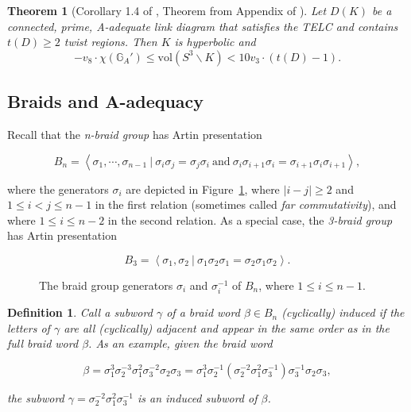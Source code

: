 \documentclass{article}
\newtheorem{definition}{Definition}[section]
\newtheorem{theorem}{Theorem}[section]
\begin{document}
\begin{theorem}[Corollary 1.4 of \cite{New}, Theorem from Appendix of \cite{Lackenby}]
Let $D(K)$ be a connected, prime, A-adequate link diagram that satisfies the TELC and contains $t(D) \geq 2$ twist regions. Then $K$ is hyperbolic and
\label{Cor}
\begin{equation*}
-v_{8}\cdot\chi(\mathbb{G}_{A}') \leq \mathrm{vol}(S^{3}\backslash K) < 10v_{3}\cdot(t(D)-1).
\end{equation*}
\end{theorem}


















  
	
	


\subsection{Braids and A-adequacy} 


Recall that the \emph{n-braid group} has Artin presentation

$$\displaystyle B_{n} = \left\langle \sigma_{1}, \cdots, \sigma_{n-1}\ |\ \sigma_{i}\sigma_{j}=\sigma_{j}\sigma_{i}\ \mathrm{and}\ \sigma_{i}\sigma_{i+1}\sigma_{i} = \sigma_{i+1}\sigma_{i}\sigma_{i+1}\right\rangle,$$ 

\noindent where the generators $\sigma_{i}$ are depicted in Figure~\ref{braidgen}, where $\left|i-j\right|\geq2$ and $1 \leq i < j \leq n-1$ in the first relation (sometimes called \emph{far commutativity}), and where $1\leq i\leq n-2$ in the second relation. As a special case, the \emph{3-braid group} has Artin presentation

$$B_{3}=\left\langle \sigma_{1}, \sigma_{2}\ |\ \sigma_{1}\sigma_{2}\sigma_{1}=\sigma_{2}\sigma_{1}\sigma_{2}\right\rangle.$$ 

\begin{figure}
	\centering
	\def\svgwidth{3in}
		
	\caption{The braid group generators $\sigma_{i}$ and $\sigma_{i}^{-1}$ of $B_{n}$, where $1 \leq i \leq n-1$.}
	\label{braidgen}
\end{figure}

\begin{definition}
Call a subword $\gamma$ of a braid word $\beta \in B_{n}$ \emph{(cyclically) induced} if the letters of $\gamma$ are all (cyclically) adjacent and appear in the same order as in the full braid word $\beta$. As an example, given the braid word 

$$\beta=\sigma_{1}^{3}\sigma_{2}^{-3}\sigma_{1}^{2}\sigma_{3}^{-2}\sigma_{2}\sigma_{3}=\sigma_{1}^{3}\sigma_{2}^{-1}(\sigma_{2}^{-2}\sigma_{1}^{2}\sigma_{3}^{-1})\sigma_{3}^{-1}\sigma_{2}\sigma_{3},$$ 

\noindent the subword $\gamma=\sigma_{2}^{-2}\sigma_{1}^{2}\sigma_{3}^{-1}$ is an induced subword of $\beta$. 
\end{definition} 
\end{document}
